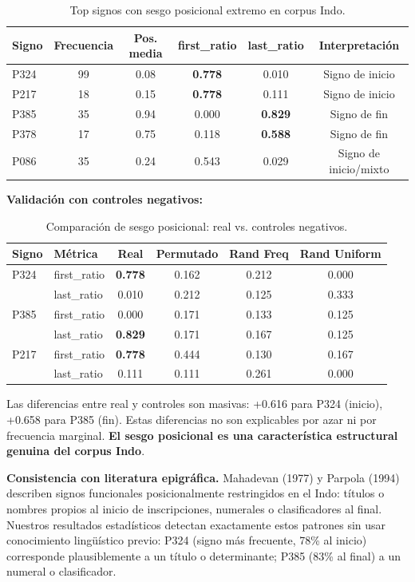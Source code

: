 \documentclass[11pt,a4paper]{article}
\newcommand{\1}{\mathbf{1}}
\numberwithin{equation}{section}
\begin{document}
\begin{table}[h]
\centering
\caption{Top signos con sesgo posicional extremo en corpus Indo.}
\label{tab:top_positional}
\begin{tabular}{lccccc}
\toprule
Signo & Frecuencia & Pos. media & first\_ratio & last\_ratio & Interpretación \\
\midrule
P324 & 99 & 0.08 & \textbf{0.778} & 0.010 & Signo de inicio \\
P217 & 18 & 0.15 & \textbf{0.778} & 0.111 & Signo de inicio \\
P385 & 35 & 0.94 & 0.000 & \textbf{0.829} & Signo de fin \\
P378 & 17 & 0.75 & 0.118 & \textbf{0.588} & Signo de fin \\
P086 & 35 & 0.24 & 0.543 & 0.029 & Signo de inicio/mixto \\
\bottomrule
\end{tabular}
\end{table}

\textbf{Validación con controles negativos:}

\begin{table}[h]
\centering
\caption{Comparación de sesgo posicional: real vs. controles negativos.}
\label{tab:positional_controls}
\begin{tabular}{llcccc}
\toprule
Signo & Métrica & Real & Permutado & Rand Freq & Rand Uniform \\
\midrule
P324 & first\_ratio & \textbf{0.778} & 0.162 & 0.212 & 0.000 \\
     & last\_ratio & 0.010 & 0.212 & 0.125 & 0.333 \\
P385 & first\_ratio & 0.000 & 0.171 & 0.133 & 0.125 \\
     & last\_ratio & \textbf{0.829} & 0.171 & 0.167 & 0.125 \\
P217 & first\_ratio & \textbf{0.778} & 0.444 & 0.130 & 0.167 \\
     & last\_ratio & 0.111 & 0.111 & 0.261 & 0.000 \\
\bottomrule
\end{tabular}
\end{table}

Las diferencias entre real y controles son masivas: +0.616 para P324 (inicio), +0.658 para P385 (fin). Estas diferencias no son explicables por azar ni por frecuencia marginal. \textbf{El sesgo posicional es una característica estructural genuina del corpus Indo}.

\textbf{Consistencia con literatura epigráfica.} Mahadevan (1977) y Parpola (1994) describen signos funcionales posicionalmente restringidos en el Indo: títulos o nombres propios al inicio de inscripciones, numerales o clasificadores al final. Nuestros resultados estadísticos detectan exactamente estos patrones sin usar conocimiento lingüístico previo: P324 (signo más frecuente, 78\% al inicio) corresponde plausiblemente a un título o determinante; P385 (83\% al final) a un numeral o clasificador.
\end{document}
